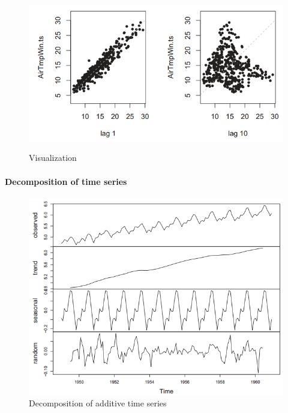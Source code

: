 \begin{figure}[H]
\begin{minipage}[t]{.42\textwidth}
					\label{Fig:tsBoxPlot}
				\end{minipage}
				\begin{minipage}[t]{.42\textwidth}
					\includegraphics[width=1\linewidth]{images/tsLagPlot.png}
					\label{Fig:tsLagPlot}
				\end{minipage}
			\caption{Visualization}
			\end{figure}
		
	\paragraph{Decomposition of time series}
		\begin{figure}[H]\centering
			\includegraphics[width=0.7\linewidth]{images/tsDecomposition.png}
			\caption{Decomposition of additive time series}
			\label{Fig:tsDecomposition}
		\end{figure}
		
